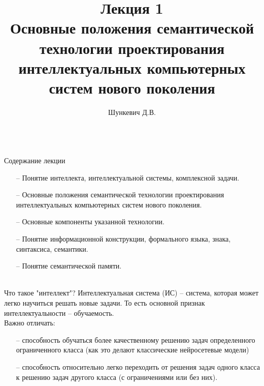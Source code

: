 
\title{Лекция 1\\Основные положения семантической технологии проектирования интеллектуальных компьютерных систем нового поколения \vspace{-2em}} 
\author[]{Шункевич Д.В.}

\begin{frame}
	\titlepage
\end{frame}

\begin{frame}{\\Содержание лекции}
	\topline
	\justifying
	\begin{itemize}
		\item[--] Понятие интеллекта, интеллектуальной системы, комплексной задачи.
		\item[--] Основные положения семантической технологии проектирования интеллектуальных компьютерных систем нового поколения.
		\item[--] Основные компоненты указанной технологии.
		\item[--] Понятие информационной конструкции, формального языка, знака, синтаксиса, семантики.
		\item[--] Понятие семантической памяти.
	\end{itemize}
\end{frame}

\begin{frame}{\\Что такое "интеллект"?}
	\vspace{10mm}
	Интеллектуальная система (ИС) -- система, которая может легко научиться решать новые задачи. То есть основной признак интеллектуальности -- обучаемость.\\ \vspace{5mm}
	Важно отличать:
	\begin{itemize}
		\item[--] способность обучаться более качественному решению задач определенного ограниченного класса (как это делают классические нейросетевые модели) \\
		\item[--] способность относительно легко переходить от решения задач одного класса к решению задач другого класса (с ограничениями или без них).
	\end{itemize}
\end{frame}

